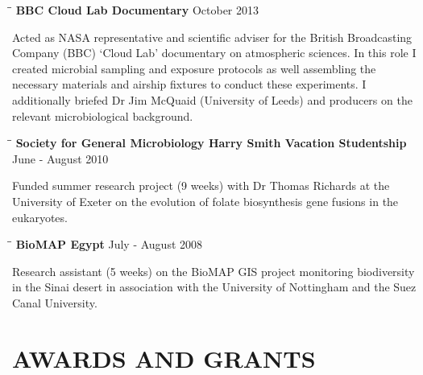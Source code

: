 \documentclass{res}
\begin{document}
\begin{resume}
     \vspace{-0.1in}
   \begin{tabbing}
   \hspace{2in}\= \hspace{2.6in}\= \kill 
    {\bf BBC Cloud Lab Documentary} \> \>        October 2013\\
     \end{tabbing}\vspace{-20pt}      
     Acted as NASA representative and scientific adviser for the British Broadcasting Company (BBC) `Cloud Lab' documentary on atmospheric sciences. In this role I created microbial sampling and exposure protocols as well assembling the necessary materials and airship fixtures to conduct these experiments. I additionally briefed Dr Jim McQuaid (University of Leeds) and producers on the relevant microbiological background. 

   \vspace{-0.1in}
      \begin{tabbing}
   \hspace{2in}\= \hspace{2.6in}\= \kill 
    {\bf Society for General Microbiology Harry Smith Vacation Studentship} \> \>        June - August 2010\\
     \end{tabbing}\vspace{-20pt}      
     Funded summer research project (9 weeks) with Dr Thomas Richards at the University of Exeter on the evolution of folate biosynthesis gene fusions in the eukaryotes.

\vspace{-0.1in}
   \begin{tabbing}
   \hspace{2in}\= \hspace{2.6in}\= \kill 
    {\bf BioMAP Egypt} \> \>        July - August 2008\\
     \end{tabbing}\vspace{-20pt}      
     Research assistant (5 weeks) on the BioMAP GIS project monitoring biodiversity in the Sinai desert in association with the University of Nottingham and the Suez Canal University.

\section{AWARDS AND GRANTS}

   \vspace{-0.05in}  


\end{resume}
\end{document}
